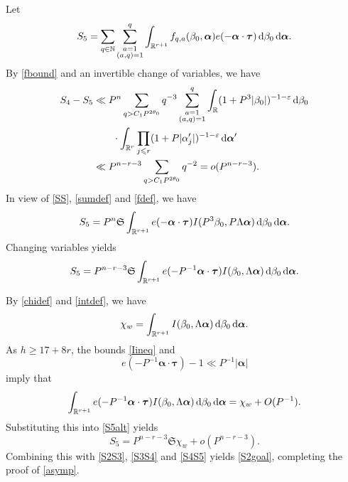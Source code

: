\documentclass[12pt,reqno]{amsart}
\theoremstyle{definition}
\theoremstyle{remark}
\numberwithin{equation}{section}
\begin{document}
Let
\[
S_5 = \sum_{q \in {\mathbb N}} \sum_{\substack{a=1 \\ (a,q)= 1}}^q \displaystyle \int_{{\mathbb R}^{r+1}} 
f_{q,a}({{\beta}}_0,{\boldsymbol{{\alpha}}}) e(-{\boldsymbol{{\alpha}}} \cdot {\boldsymbol{\tau}}) {{\,{\rm d}}} {{\beta}}_0 {{\,{\rm d}}} {\boldsymbol{{\alpha}}}.
\]
By \eqref{fbound} and an invertible change of variables, we have
\begin{align} \notag
S_4 - S_5 & \ll P^n \sum_{q > C_1 P^{2 {{\theta}}_0}} q^{-3} \sum_{\substack{a=1 \\ (a,q)= 1}}^q 
\int_{\mathbb R}
(1 + P^3 |{{\beta}}_0|)^{-1-{\varepsilon}} {{\,{\rm d}}} {{\beta}}_0 \\
\notag & \qquad \cdot
\int_{{\mathbb R}^r} \prod_{j {\leqslant} r} (1+P|{{\alpha}}'_j|)^{-1-{\varepsilon}} {{\,{\rm d}}} {\boldsymbol{{\alpha}}}' \\
\label{S4S5}
& \ll P^{n-r-3} \sum_{q > C_1 P^{2 {{\theta}}_0}} q^{-2} = o(P^{n-r-3}).
\end{align}
In view of \eqref{SS}, \eqref{sumdef} and \eqref{fdef}, we have
\[
S_5 = P^n {\mathfrak S} \int_{{\mathbb R}^{r+1}} e(-{\boldsymbol{{\alpha}}} \cdot {\boldsymbol{\tau}})I(P^3 {{\beta}}_0, P {{\Lambda}} {\boldsymbol{{\alpha}}}) {{\,{\rm d}}} {{\beta}}_0 {{\,{\rm d}}} {\boldsymbol{{\alpha}}}.
\]
Changing variables yields
\begin{equation} \label{S5alt}
S_5 = P^{n-r-3} {\mathfrak S} \int_{{\mathbb R}^{r+1}} e(- P^{-1} {\boldsymbol{{\alpha}}} \cdot {\boldsymbol{\tau}}) I({{\beta}}_0, {{\Lambda}} {\boldsymbol{{\alpha}}}) {{\,{\rm d}}} {{\beta}}_0 {{\,{\rm d}}} {\boldsymbol{{\alpha}}}.
\end{equation}

By \eqref{chidef} and \eqref{intdef}, we have
\[
\chi_w = \int_{{\mathbb R}^{r+1}} I({{\beta}}_0, {{\Lambda}} {\boldsymbol{{\alpha}}}) {{\,{\rm d}}} {{\beta}}_0 {{\,{\rm d}}} {\boldsymbol{{\alpha}}}.
\]
As $h {\geqslant} 17 + 8r$, the bounds \eqref{Iineq} and
\[
e(-P^{-1} {\boldsymbol{{\alpha}}} \cdot {\boldsymbol{\tau}}) - 1  \ll P^{-1} |{\boldsymbol{{\alpha}}}|
\]
imply that 
\[
\int_{{\mathbb R}^{r+1}} e(- P^{-1} {\boldsymbol{{\alpha}}} \cdot {\boldsymbol{\tau}}) I({{\beta}}_0, {{\Lambda}} {\boldsymbol{{\alpha}}}) {{\,{\rm d}}} {{\beta}}_0 {{\,{\rm d}}} {\boldsymbol{{\alpha}}}
= \chi_w + O(P^{-1}).
\]
Substituting this into \eqref{S5alt} yields
\[
S_5 = P^{n-r-3} {\mathfrak S} \chi_w + o(P^{n-r-3}).
\]
Combining this with \eqref{S2S3}, \eqref{S3S4} and \eqref{S4S5} yields \eqref{S2goal}, completing the proof of \eqref{asymp}.
\end{document}
